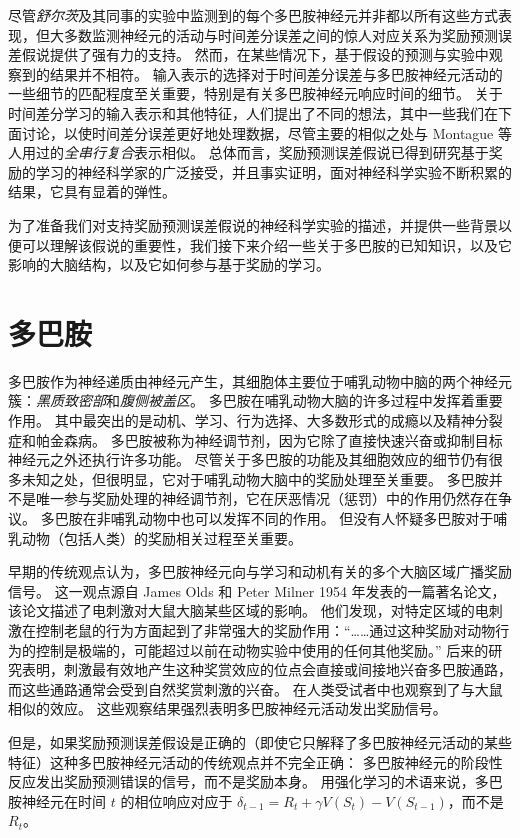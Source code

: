 尽管\textit{舒尔茨}及其同事的实验中监测到的每个多巴胺神经元并非都以所有这些方式表现，但大多数监测神经元的活动与时间差分误差之间的惊人对应关系为奖励预测误差假说提供了强有力的支持。
然而，在某些情况下，基于假设的预测与实验中观察到的结果并不相符。
输入表示的选择对于时间差分误差与多巴胺神经元活动的一些细节的匹配程度至关重要，特别是有关多巴胺神经元响应时间的细节。
关于时间差分学习的输入表示和其他特征，人们提出了不同的想法，其中一些我们在下面讨论，以使时间差分误差更好地处理数据，尽管主要的相似之处与 Montague 等人用过的\textit{全串行复合}表示相似。
总体而言，奖励预测误差假说已得到研究基于奖励的学习的神经科学家的广泛接受，并且事实证明，面对神经科学实验不断积累的结果，它具有显着的弹性。


为了准备我们对支持奖励预测误差假说的神经科学实验的描述，并提供一些背景以便可以理解该假说的重要性，我们接下来介绍一些关于多巴胺的已知知识，以及它影响的大脑结构，以及它如何参与基于奖励的学习。


\section{多巴胺} \label{sec:dopamine}

多巴胺作为神经递质由神经元产生，其细胞体主要位于哺乳动物中脑的两个神经元簇：\textit{黑质致密部}和\textit{腹侧被盖区}。
多巴胺在哺乳动物大脑的许多过程中发挥着重要作用。
其中最突出的是动机、学习、行为选择、大多数形式的成瘾以及精神分裂症和帕金森病。
多巴胺被称为神经调节剂，因为它除了直接快速兴奋或抑制目标神经元之外还执行许多功能。
尽管关于多巴胺的功能及其细胞效应的细节仍有很多未知之处，但很明显，它对于哺乳动物大脑中的奖励处理至关重要。
多巴胺并不是唯一参与奖励处理的神经调节剂，它在厌恶情况（惩罚）中的作用仍然存在争议。
多巴胺在非哺乳动物中也可以发挥不同的作用。
但没有人怀疑多巴胺对于哺乳动物（包括人类）的奖励相关过程至关重要。


早期的传统观点认为，多巴胺神经元向与学习和动机有关的多个大脑区域广播奖励信号。
这一观点源自 James Olds 和 Peter Milner 1954 年发表的一篇著名论文，该论文描述了电刺激对大鼠大脑某些区域的影响。
他们发现，对特定区域的电刺激在控制老鼠的行为方面起到了非常强大的奖励作用：“……通过这种奖励对动物行为的控制是极端的，可能超过以前在动物实验中使用的任何其他奖励。”\cite{olds1954positive}
后来的研究表明，刺激最有效地产生这种奖赏效应的位点会直接或间接地兴奋多巴胺通路，而这些通路通常会受到自然奖赏刺激的兴奋。
在人类受试者中也观察到了与大鼠相似的效应。
这些观察结果强烈表明多巴胺神经元活动发出奖励信号。


但是，如果奖励预测误差假设是正确的（即使它只解释了多巴胺神经元活动的某些特征）这种多巴胺神经元活动的传统观点并不完全正确：
多巴胺神经元的阶段性反应发出奖励预测错误的信号，而不是奖励本身。
用强化学习的术语来说，多巴胺神经元在时间 $ t $ 的相位响应对应于 $ \delta_{t-1} = R_t + \gamma V(S_t) - V(S_{t-1}) $，而不是 $ R_t $。


